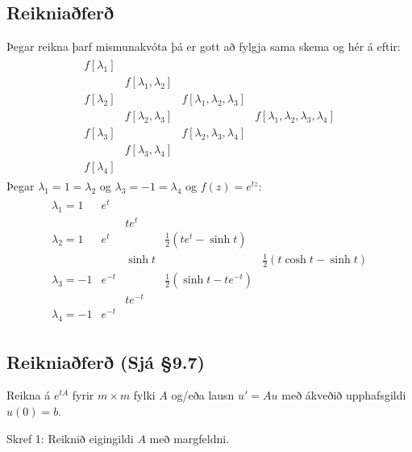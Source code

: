 \documentclass[a4paper,10pt,icelandic]{sphinxmanual}
\begin{document}
\subsection{Reikniaðferð}
\label{\detokenize{Kafli09:reikniafer}}
Þegar reikna þarf mismunakvóta þá er gott að fylgja sama skema og hér á eftir:
\begin{equation*}
\begin{split}\begin{matrix}
f[\lambda_1]\\
            &f[\lambda_1,\lambda_2]\\
f[\lambda_2]&                       &f[\lambda_1, \lambda_2, \lambda_3]\\
        &f[\lambda_2,\lambda_3]& &f[\lambda_1,\lambda_2,\lambda_3,\lambda_4]\\
f[\lambda_3]&                       &f[\lambda_2, \lambda_3, \lambda_4]\\
            &f[\lambda_3,\lambda_4]\\
f[\lambda_4]
\end{matrix}\end{split}
\end{equation*}
Þegar \(\lambda_1=1=\lambda_2\) og \(\lambda_3=-1=\lambda_4\) og
\(f(z)=e^{tz}\):
\begin{equation*}
\begin{split}\begin{matrix}
\lambda_1=1 & e^t  \\
 & & te^t& \\
\lambda_2=1 & e^t  &  & \tfrac 12(te^t-\sinh t)\\
 & & \sinh t & & \tfrac 12(t\cosh t-\sinh t) \\
\lambda_3=-1 & e^{-t}  & & \tfrac 12(\sinh t -te^{-t})\\
 & & te^{-t}& \\
\lambda_4=-1 & e^{-t}
\end{matrix}\end{split}
\end{equation*}

\subsection{Reikniaðferð (Sjá \S{}9.7)}
\label{\detokenize{Kafli09:reikniafer-sja-9-7}}
Reikna á \(e^{tA}\) fyrir \(m\times m\) fylki \(A\) og/eða lausn \(u'=Au\) með ákveðið upphafsgildi \(u(0)=b\).

Skref 1: Reiknið eigingildi \(A\) með margfeldni.
\end{document}
